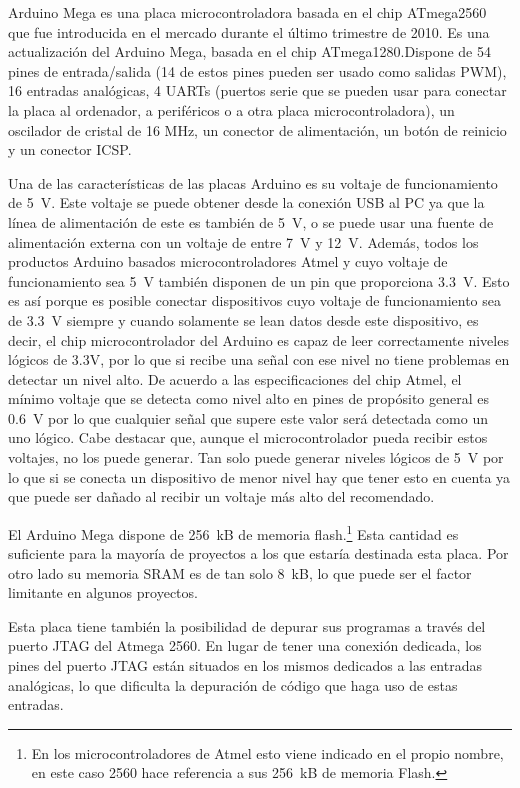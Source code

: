 
Arduino Mega es una placa microcontroladora basada en el chip ATmega2560 que fue introducida en el mercado durante el último trimestre de 2010.  
Es una actualización del Arduino Mega, basada en el chip ATmega1280.\@ Dispone de 54 pines de entrada/salida (14 de estos pines pueden ser usado como salidas PWM), 16 entradas analógicas, 4 UARTs (puertos serie que se pueden usar para conectar la placa al ordenador, a periféricos o a otra placa microcontroladora), un oscilador de cristal de 16 MHz, un conector de alimentación, un botón de reinicio y un conector ICSP.\@

Una de las características de las placas Arduino es su voltaje de funcionamiento de 5~V. Este voltaje se puede obtener desde la conexión USB al PC ya que la línea de alimentación de este es también de 5~V, o se puede usar una fuente de alimentación externa con un voltaje de entre 7~V y 12~V. Además, todos los productos Arduino basados microcontroladores Atmel y cuyo voltaje de funcionamiento sea 5~V también disponen de un pin que proporciona 3.3~V. Esto es así porque es posible conectar dispositivos cuyo voltaje de funcionamiento sea de 3.3~V siempre y cuando solamente se lean datos desde este dispositivo, es decir, el chip microcontrolador del Arduino es capaz de leer correctamente niveles lógicos de 3.3V, por lo que si recibe una señal con ese nivel no tiene problemas en detectar un nivel alto. De acuerdo a las especificaciones del chip Atmel, el mínimo voltaje que se detecta como nivel alto en pines de propósito general es 0.6~V por lo que cualquier señal que supere este valor será detectada como un uno lógico. Cabe destacar que, aunque el microcontrolador pueda recibir estos voltajes, no los puede generar. Tan solo puede generar niveles lógicos de 5~V por lo que si se conecta un dispositivo de menor nivel hay que tener esto en cuenta ya que puede ser dañado al recibir un voltaje más alto del recomendado.

El Arduino Mega dispone de 256~kB de memoria flash.\footnote{En los microcontroladores de Atmel esto viene indicado en el propio nombre, en este caso 2560 hace referencia a sus 256~kB de memoria Flash.} Esta cantidad es suficiente para la mayoría de proyectos a los que estaría destinada esta placa. Por otro lado su memoria SRAM es de tan solo 8~kB, lo que puede ser el factor limitante en algunos proyectos.

Esta placa tiene también la posibilidad de depurar sus programas a través del puerto JTAG del Atmega 2560. En lugar de tener una conexión dedicada, los pines del puerto JTAG están situados en los mismos dedicados a las entradas analógicas, lo que dificulta la depuración de código que haga uso de estas entradas.

